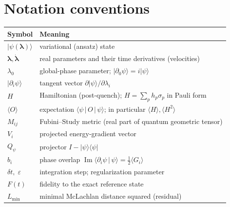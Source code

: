 \documentclass[12pt,a4paper]{article}
\newcommand{\ket}[1]{\lvert #1 \rangle}
\newcommand{\bra}[1]{\langle #1 \rvert}
\newcommand{\braket}[2]{\langle #1 \,|\, #2 \rangle}
\newcommand{\mel}[3]{\langle #1 \,|\, #2 \,|\, #3 \rangle}
\newcommand{\im}{\operatorname{Im}}
\newcommand{\dlam}{\dot{\boldsymbol{\lambda}}}
\begin{document}
\section{Notation conventions}

\begin{center}
\renewcommand{\arraystretch}{1.3}
\begin{tabular}{ll}
\toprule
\textbf{Symbol} & \textbf{Meaning}\\
\midrule
$\ket{\psi(\boldsymbol{\lambda})}$ & variational (ansatz) state\\
$\boldsymbol{\lambda},\dlam$ & real parameters and their time derivatives (velocities)\\
$\lambda_0$ & global-phase parameter; $\ket{\partial_0\psi}=i\ket{\psi}$\\
$\ket{\partial_i\psi}$ & tangent vector $\partial\ket{\psi}/\partial\lambda_i$\\
$H$ & Hamiltonian (post-quench); $H=\sum_p h_p\sigma_p$ in Pauli form\\
$\langle O\rangle$ & expectation $\mel{\psi}{O}{\psi}$; in particular $\langle H\rangle,\langle H^2\rangle$\\
$M_{ij}$ & Fubini--Study metric (real part of quantum geometric tensor)\\
$V_i$ & projected energy-gradient vector\\
$Q_\psi$ & projector $I-\ket{\psi}\bra{\psi}$\\
$b_i$ & phase overlap $\im\braket{\partial_i\psi}{\psi}=\tfrac12\langle G_i\rangle$\\
$\delta t,\;\varepsilon$ & integration step; regularization parameter\\
$F(t)$ & fidelity to the exact reference state\\
$L_{\min}$ & minimal McLachlan distance squared (residual)\\
\bottomrule
\end{tabular}
\end{center}
\end{document}
